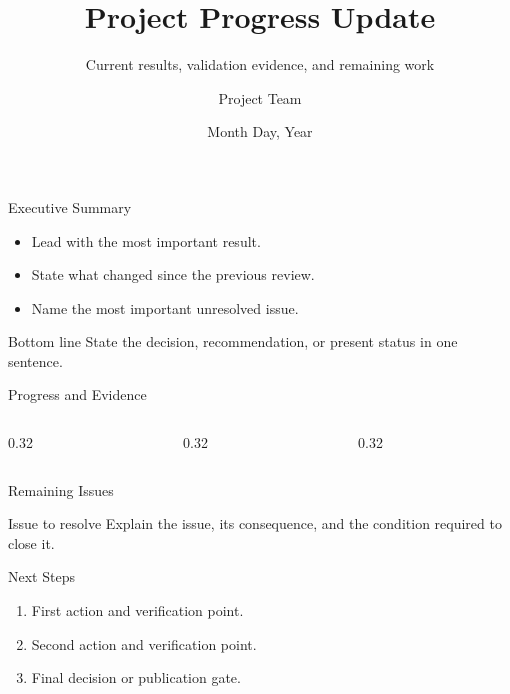 \documentclass[aspectratio=169,10pt]{beamer}
\title[Project Progress Update]{Project Progress Update}
\subtitle{Current results, validation evidence, and remaining work}
\author{Project Team}
\date{Month Day, Year}
\begin{document}

\begin{frame}{Executive Summary}
\begin{itemize}
  \item Lead with the most important result.
  \item State what changed since the previous review.
  \item Name the most important unresolved issue.
\end{itemize}
\begin{exampleblock}{Bottom line}
State the decision, recommendation, or present status in one sentence.
\end{exampleblock}
\end{frame}

\begin{frame}{Progress and Evidence}
\begin{columns}[T,onlytextwidth]
\begin{column}{0.32\linewidth}
\end{column}
\begin{column}{0.32\linewidth}
\end{column}
\begin{column}{0.32\linewidth}
\end{column}
\end{columns}
\end{frame}

\begin{frame}{Remaining Issues}
\begin{alertblock}{Issue to resolve}
Explain the issue, its consequence, and the condition required to close it.
\end{alertblock}
\end{frame}

\begin{frame}{Next Steps}
\begin{enumerate}
  \item First action and verification point.
  \item Second action and verification point.
  \item Final decision or publication gate.
\end{enumerate}
\end{frame}
\end{document}
